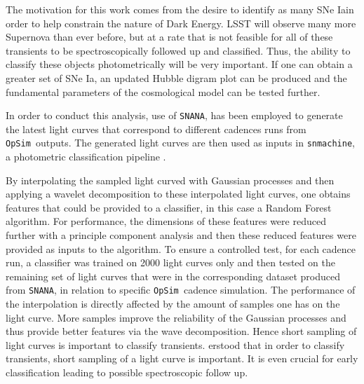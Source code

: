 \documentclass[a4paper,10pt]{article}
\newcommand{\opsim}{{\tt OpSim\ }}
\newcommand{\sne}{{SNe Ia}}
\begin{document}
The motivation for this work comes from the desire to identify as many \sne in
order to help constrain the nature of Dark Energy.
LSST will observe many more Supernova than ever before, but at a rate that is
not feasible for all of these transients to be spectroscopically followed up and
classified. Thus, the ability to classify these objects photometrically will be very
important. If one can obtain a greater set of \sne, an updated Hubble
digram plot can be produced and the fundamental parameters of the cosmological
model can be tested further.

In order to conduct this analysis, use of
{\tt SNANA}\cite{kessler2009snana}, has been employed to generate the latest light curves that
correspond to different cadences runs from \opsim outputs. The generated light
curves are then used as inputs in {\tt snmachine}, a photometric
classification pipeline \cite{lochner2016photometric}.

By interpolating the sampled light curved with Gaussian processes and then
applying a wavelet decomposition to these interpolated light curves, one obtains features
that could be provided to a classifier, in this case a Random Forest algorithm.
For performance, the dimensions of these features were reduced further with a principle
component analysis and then these reduced features were provided as inputs to the algorithm.
To ensure a controlled test,
for each cadence run, a classifier was trained on 2000 light
curves only and then tested on the remaining set of light curves that were in the
corresponding dataset produced from {\tt SNANA}, in relation to specific
\opsim cadence simulation.
The performance of the interpolation is directly affected by the amount of
samples one has on the light curve. More samples improve the reliability of the Gaussian processes and thus provide better features via the wave
decomposition. Hence short sampling of light curves is important to classify transients. erstood that in order to classify transients, short
sampling of a light curve is important. It is even crucial for early classification leading to possible spectroscopic follow up.
\end{document}

